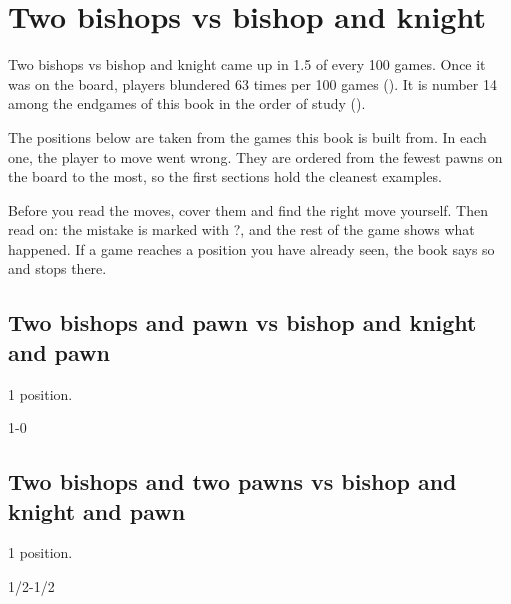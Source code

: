 \chapter{Two bishops vs bishop and knight}\label{ch:two-bishops-vs-bishop-and-knight}
Two bishops vs bishop and knight came up in 1.5 of every 100 games. Once it was on the board, players blundered 63 times per 100 games (). It is number 14 among the endgames of this book in the order of study ().

The positions below are taken from the games this book is built from. In each one, the player to move went wrong. They are ordered from the fewest pawns on the board to the most, so the first sections hold the cleanest examples.

Before you read the moves, cover them and find the right move yourself. Then read on: the mistake is marked with ?, and the rest of the game shows what happened. If a game reaches a position you have already seen, the book says so and stops there.


\section{Two bishops and pawn vs bishop and knight and pawn}
1 position.


1-0\par
\section{Two bishops and two pawns vs bishop and knight and pawn}
1 position.


1/2-1/2\par
